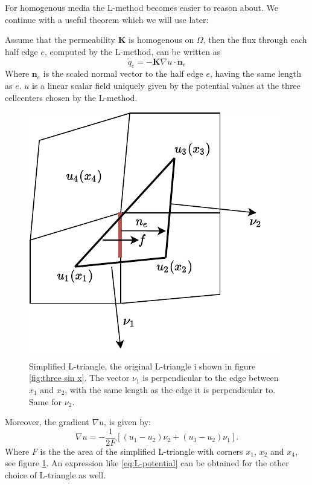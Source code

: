 \documentclass[../Main/main.tex]{subfiles}
\begin{document}
	\par 
	For homogenous media the L-method becomes easier to reason about. We continue with a useful theorem which we will use later:
	
	\begin{lemma} \label{lemma:L_potential}
		Assume that the permeability $\bm{K}$ is homogenous on $\Omega$, then the flux through each half edge $e$, computed by the L-method, can be written as
		\begin{equation}\label{eq:L flux simplified}
			\tilde{q}_e = -\bm{K} \nabla u \cdot \bm{n}_e
		\end{equation}
		Where $\bm{n}_e$ is the scaled normal vector to the half edge $e$, having the same length as $e$. $u$ is a linear scalar field uniquely given by the potential values at the three cellcenters chosen by the L-method.
		\begin{figure}[H]
			\centering
			\includegraphics{Right choice linear potential.pdf}
			\caption{Simplified L-triangle, the original L-triangle i shown in figure \ref{fig:three sin x}. The vector $\nu_1$ is perpendicular to the edge between $x_1$ and $x_2$, with the same length as the edge it is perpendicular to. Same for $\nu_2$.}
			\label{fig:L-triangle-potential}
		\end{figure}
		Moreover, the gradient $\nabla u$, is given by:
		\begin{equation}\label{eq:L-potential}
			\nabla u = -\frac{1}{2F}[(u_1 - u_2)\nu_2 + (u_3 - u_2)\nu_1 ].
		\end{equation}
		Where $F$ is the the area of the simplified L-triangle with corners $x_1$, $x_2$ and $x_4$, see figure  \ref{fig:L-triangle-potential}. An expression like \eqref{eq:L-potential} can be obtained for the other choice of L-triangle as well.
	\end{lemma}
\end{document}
